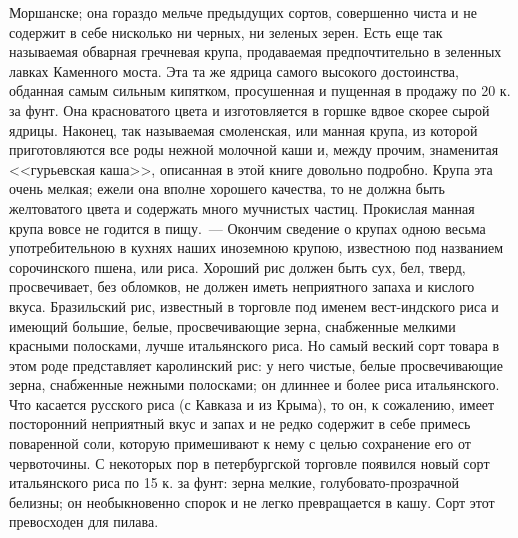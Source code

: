 Моршанске; она гораздо мельче предыдущих сортов, совершенно чиста и не содержит в себе нисколько ни черных, ни зеленых зерен. Есть еще так называемая обварная гречневая крупа, продаваемая предпочтительно в зеленных лавках Каменного моста. Эта та же ядрица самого высокого достоинства, обданная самым сильным кипятком, просушенная и пущенная в продажу по 20 к. за фунт. Она красноватого цвета и изготовляется в горшке вдвое скорее сырой ядрицы. Наконец, так называемая смоленская, или манная крупа, из которой приготовляются все роды нежной молочной каши и, между прочим, знаменитая <<гурьевская каша>>, описанная в этой книге довольно подробно. Крупа эта очень мелкая; ежели она вполне хорошего качества, то не должна быть желтоватого цвета и содержать много мучнистых частиц. Прокислая манная крупа вовсе не годится в пищу.~--- Окончим сведение о крупах одною весьма употребительною в кухнях наших иноземною крупою, известною под названием сорочинского пшена, или риса. Хороший рис должен быть сух, бел, тверд, просвечивает, без обломков, не должен иметь неприятного запаха и кислого вкуса. Бразильский рис, известный в торговле под именем вест-индского риса и имеющий большие, белые, просвечивающие зерна, снабженные мелкими красными полосками, лучше итальянского риса. Но самый веский сорт товара в этом роде представляет каролинский рис: у него чистые, белые просвечивающие зерна, снабженные нежными полосками; он длиннее и более риса итальянского. Что касается русского риса (с Кавказа и из Крыма), то он, к сожалению, имеет посторонний неприятный вкус и запах и не редко содержит в себе примесь поваренной соли, которую примешивают к нему с целью сохранение его от червоточины. С некоторых пор в петербургской торговле появился новый сорт итальянского риса по 15 к. за фунт: зерна мелкие, голубовато-прозрачной белизны; он необыкновенно спорок и не легко превращается в кашу. Сорт этот превосходен для пилава.

